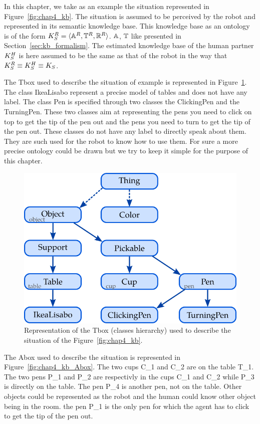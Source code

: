 In this chapter, we take as an example the situation represented in Figure~\ref{fig:chap4_kb}. The situation is assumed to be perceived by the robot and represented in its semantic knowledge base. This knowledge base as an ontology is of the form $K_S^R = \langle \mathbb{A}^R, \mathbb{T}^R, \mathbb{R}^R \rangle$. $\mathbb{A}$, $\mathbb{T}$ like presented in Section~\ref{sec:kb_formalism}. The estimated knowledge base of the human partner $K_S^H$ is here assumed to be the same as that of the robot in the way that $K_S^R \equiv K_S^H \equiv K_S$.

The Tbox used to describe the situation of example is represented in Figure~\ref{fig:chap4_kb_Tbox}. The class IkeaLisabo represent a precise model of tables and does not have any label. The class Pen is specified through two classes the ClickingPen and the TurningPen. These two classes aim at representing the pens you need to click on top to get the tip of the pen out and the pens you need to turn to get the tip of the pen out. These classes do not have any label to directly speak about them. They are such used for the robot to know how to use them. For sure a more precise ontology could be drawn but we try to keep it simple for the purpose of this chapter.

\begin{figure}[h!]
\centering
\includegraphics[scale=0.4]{figures/chapter4/pens_Tbox.png}
\caption{\label{fig:chap4_kb_Tbox} Representation of the Tbox (classes hierarchy) used to describe the situation of the Figure~\ref{fig:chap4_kb}. }
\end{figure}

The Abox used to describe the situation is represented in Figure~\ref{fig:chap4_kb_Abox}. The two cups C\_1 and C\_2 are on the table T\_1. The two pens P\_1 and P\_2 are respectivly in the cups C\_1 and C\_2 while P\_3 is directly on the table. The pen P\_4 is another pen, not on the table. Other objects could be represented as the robot and the human could know other object being in the room. the pen P\_1 is the only pen for which the agent has to click to get the tip of the pen out.

